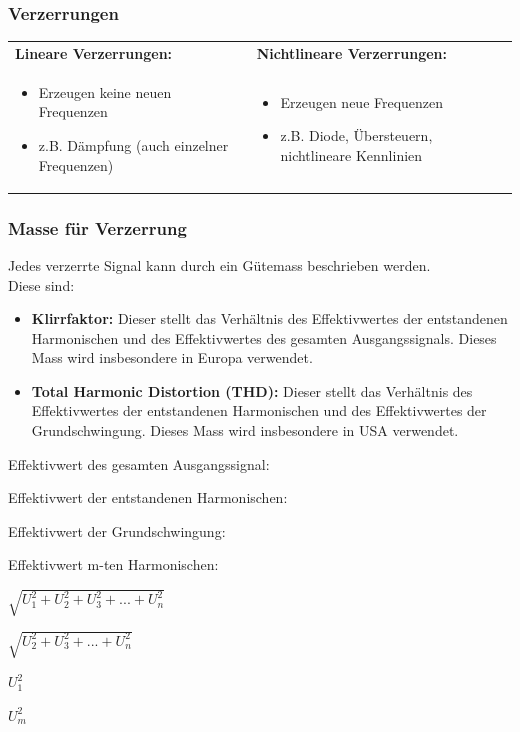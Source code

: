 		\subsubsection{Verzerrungen }
			\begin{tabular}{ll}
				\textbf{Lineare Verzerrungen:}
			&	\textbf{Nichtlineare Verzerrungen:}
			\\
				\parbox{9cm}{
					\begin{itemize}
						\item Erzeugen keine neuen Frequenzen
						\item z.B. Dämpfung (auch einzelner Frequenzen)
					\end{itemize}}
			&	\parbox{9cm}{
					\begin{itemize}
						\item Erzeugen neue Frequenzen
						\item z.B. Diode, Übersteuern, nichtlineare Kennlinien
					\end{itemize}}
			\\
			\end{tabular}
			
		\subsubsection{Masse für Verzerrung }
			Jedes verzerrte Signal kann durch ein Gütemass beschrieben werden. \\
			Diese sind:
			\begin{itemize}
				\item \textbf{Klirrfaktor:} Dieser stellt das Verhältnis des Effektivwertes der entstandenen Harmonischen und des Effektivwertes des gesamten Ausgangssignals. Dieses Mass wird insbesondere in Europa verwendet.
				\item \textbf{Total Harmonic Distortion (THD):} Dieser stellt das Verhältnis des Effektivwertes der entstandenen Harmonischen und des Effektivwertes der Grundschwingung. Dieses Mass wird insbesondere in USA verwendet. 
			\end{itemize}
			\begin{multicols}{2}
				\begin{description}
					\item Effektivwert des gesamten Ausgangssignal: 
					\item Effektivwert der entstandenen Harmonischen: 
					\item Effektivwert der Grundschwingung: 
					\item Effektivwert m-ten Harmonischen: 
				\end{description}
				\columnbreak
				\begin{description}
					\item $\sqrt{U_1^2 + U_2^2 + U_3^2 + ... + U_n^2}$
					\item $\sqrt{U_2^2 + U_3^2 + ... + U_n^2}$
					\item $U_1^2$
					\item $U_m^2$
				\end{description}
			\end{multicols}
		
